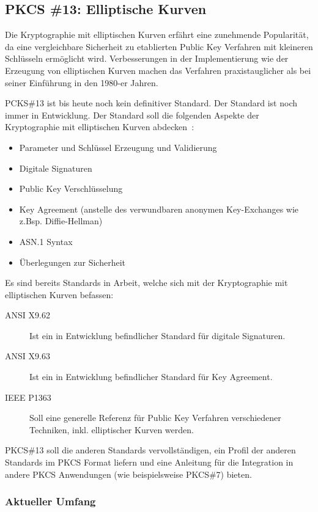 \documentclass[10pt,a4paper]{article}
\begin{document}
\subsection{PKCS \#13: Elliptische Kurven}

Die Kryptographie mit elliptischen Kurven erfährt eine zunehmende Popularität, da eine
vergleichbare Sicherheit zu etablierten Public Key Verfahren mit kleineren Schlüsseln
ermöglicht wird. Verbesserungen in der Implementierung wie der Erzeugung von elliptischen
Kurven machen das Verfahren praxistauglicher als bei seiner Einführung in den 1980-er
Jahren.

PCKS\#13 ist bis heute noch kein definitiver Standard. Der Standard ist noch immer in
Entwicklung. Der Standard soll die folgenden Aspekte der Kryptographie mit elliptischen
Kurven abdecken~\cite{pkcs13-proj}:

\begin{itemize}
    \item Parameter und Schlüssel Erzeugung und Validierung
    \item Digitale Signaturen
    \item Public Key Verschlüsselung
    \item Key Agreement (anstelle des verwundbaren anonymen Key-Exchanges wie z.Bsp.
        Diffie-Hellman)
    \item ASN.1 Syntax
    \item Überlegungen zur Sicherheit
\end{itemize}

Es sind bereits Standards in Arbeit, welche sich mit der Kryptographie mit elliptischen
Kurven befassen:
\begin{description}
    \item[ANSI X9.62] Ist ein in Entwicklung befindlicher Standard für digitale
        Signaturen.
    \item[ANSI X9.63 ] Ist ein in Entwicklung befindlicher Standard für Key Agreement.
    \item[IEEE P1363] Soll eine generelle Referenz für Public Key Verfahren verschiedener
        Techniken, inkl. elliptischer Kurven werden.
\end{description}

PKCS\#13 soll die anderen Standards vervollständigen, ein Profil der anderen Standards im
PKCS Format liefern und eine Anleitung für die Integration in andere PKCS Anwendungen (wie
beispielsweise PKCS\#7) bieten.

\subsubsection{Aktueller Umfang}
\end{document}
